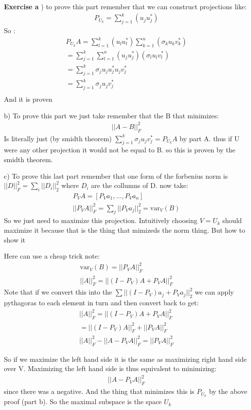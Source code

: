 \documentclass[12pt]{article}
\newenvironment{exercise}[1]{\vspace{.1in}\noindent\textbf{Exercise #1 \hspace{.05em}}}{}
\theoremstyle{definition}
\theoremstyle{remark}
\begin{document}
\begin{exercise}{6}
	a) to prove this part remember that we can construct projections like:
	\begin{align}
		P_{U_k}=\sum\limits_{j=1}^{k}\left(u_ju_j^*\right)
	\end{align}
	So :
	\begin{align}
		P_{U_k}A=\sum\limits_{l=1}^{k}\left(u_lu_l^*\right)\sum\limits_{k=1}^{n}\left(\sigma_k u_kv_k^*\right) \\
		=\sum\limits_{j=1}^{k}\sum\limits_{l=1}^{n}\left(u_ju_j^*\right)\left(\sigma_lu_lv_l^*\right)          \\
		=\sum\limits_{j=1}^{k}\sigma_ju_ju_j^*u_jv_j^*                                                         \\
		=\sum\limits_{j=1}^{k}\sigma_ju_jv_j^*                                                                 \\
	\end{align}
	And it is proven

	b) To prove this part we just take remember that the B that minimizes:
	\begin{align}
		||A-B||_F^2
	\end{align}
	Is literally just  (by smidth theorem) $\sum_{j=1}^k\sigma_ju_jv_j^*=P_{U_k}A$ by part A. thus if U were any other projection it would not be equal to B. so this is proven by the smidth theorem.

	c) To prove this last part remember that one form of the forbenius norm is $||D||_F^2=\sum_{i}||D_i||_2^2$ where $D_i$ are the collumns of D. now take:
	\begin{align}
		P_VA=[P_Va_1,\dots, P_Va_n] \\
		||P_VA||_F^2=\sum_{j}||P_Va_j||_2^2=\text{var}_{V}(B)
	\end{align}
	So we just need to maximize this projection. Intuitively choosing $V=U_k$ should maximize it because that is the thing that mimizeds the norm thing. But how to show it

	Here can use a cheap trick note:
	\begin{align}
		\text{var}_{V}(B)=||P_VA||_F^2 \\
		||A||_F^2=||(I-P_V)A+P_VA||_F^2
	\end{align}
	Note that if we convert this into the $\sum ||(I-P_V)a_j+P_Va_j||_2^2$ we can apply pythagoras to each element in turn and then convert back to get:
	\begin{align}
		||A||_F^2=||(I-P_V)A+P_VA||_F^2 \\
		=||(I-P_V)A||_F^2+||P_VA||_F^2  \\
		||A||_F^2-||A-P_VA||_F^2=||P_VA||_F^2
	\end{align}

	So if we maximize the left hand side it is the same as maximizing right hand side over V. Maximizing the left hand side is thus equivalent to minimizing:
	\begin{align}
		||A-P_VA||_F^2
	\end{align}
	since there was a negative. And the thing that minimizes this is $P_{U_k}$ by the above proof (part b). So the maximal subspace is the space $U_k$
\end{exercise}
\end{document}
